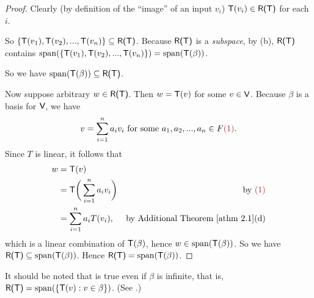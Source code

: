 \begin{proof} Clearly (by definition of the ``image'' of an input \(v_i\)) \(\textsf{T}(v_i) \in \textsf{R(T)}\) for each \(i\).

So \(\{ \textsf{T}(v_1), \textsf{T}(v_2), ..., \textsf{T}(v_n) \} \subseteq \textsf{R(T)}\).
Because \(\textsf{R(T)}\) is a \emph{subspace}, by (b), \(\textsf{R(T)}\) contains \(\operatorname{span}(\{ \textsf{T}(v_1 ), \textsf{T}(v_2), ..., \textsf{T}(v_n) \}) = \operatorname{span}(\textsf{T}(\beta))\).

So we have \(\operatorname{span}(\textsf{T}(\beta)) \subseteq \textsf{R(T)}\).

Now suppose arbitrary \(w \in \textsf{R(T)}\).
Then \(w = \textsf{T}(v)\) for some \(v \in \textsf{V}\).
Because \(\beta\) is a basis for \(\textsf{V}\), we have
\[
    v = \sum_{i = 1}^n a_i v_i \text{ for some \(a_1, a_2, ..., a_n \in F\)} \MAROON{(1)}.
\]
Since \(T\) is linear, it follows that
\begin{align*}
    w & = \T(v) \\
      & = \T \bigg(\sum_{i = 1}^n a_i v_i \bigg) & \text{by \MAROON{(1)}} \\
      & = \sum_{i = 1}^n a_i T(v_i), & \text{by \ATHM{2.1}(d)} \\
\end{align*}
which is a linear combination of \(\textsf{T}(\beta)\), hence \(w \in \operatorname{span}(\textsf{T}(\beta))\).
So we have \(\textsf{R(T)} \subseteq \operatorname{span}(\textsf{T}(\beta))\).
Hence \(\textsf{R(T)} = \operatorname{span}(\textsf{T}(\beta))\).
\end{proof}

\begin{remark} \label{remark 2.1.5}
It should be noted that  is true even if \(\beta\) is infinite, that is, \(\textsf{R(T)} = \operatorname{span}(\{ \textsf{T}(v) : v \in \beta \})\).
(See .)
\end{remark}

